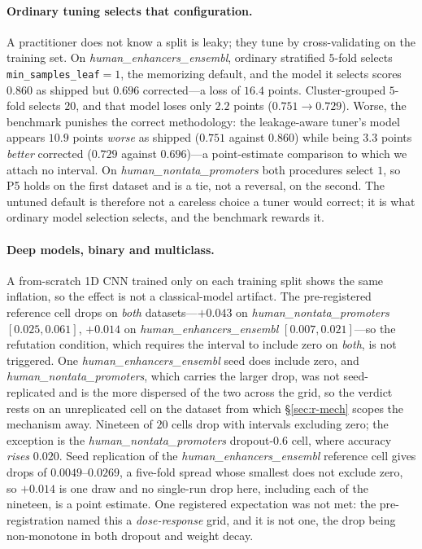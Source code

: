 \documentclass[webpdf,modern,large,namedate]{oup-authoring-template}%
\begin{document}
\paragraph{Ordinary tuning selects that configuration.}\label{sec:r-tuning} A practitioner does not know a split is leaky; they tune by cross-validating on the training set. On \textit{human\_enhancers\_ensembl}, ordinary stratified $5$-fold selects \texttt{min\_samples\_leaf}$=1$, the memorizing default, and the model it selects scores $0.860$ as shipped but $0.696$ corrected---a loss of $16.4$ points. Cluster-grouped $5$-fold selects $20$, and that model loses only $2.2$ points ($0.751\to0.729$). Worse, the benchmark punishes the correct methodology: the leakage-aware tuner's model appears $10.9$ points \emph{worse} as shipped ($0.751$ against $0.860$) while being $3.3$ points \emph{better} corrected ($0.729$ against $0.696$)---a point-estimate comparison to which we attach no interval. On \textit{human\_nontata\_promoters} both procedures select $1$, so P5 holds on the first dataset and is a tie, not a reversal, on the second. The untuned default is therefore not a careless choice a tuner would correct; it is what ordinary model selection selects, and the benchmark rewards it.

\paragraph{Deep models, binary and multiclass.}\label{sec:r-deep} A from-scratch 1D CNN trained only on each training split shows the same inflation, so the effect is not a classical-model artifact. The pre-registered reference cell drops on \emph{both} datasets---$+0.043$ on \textit{human\_nontata\_promoters} $[0.025,0.061]$, $+0.014$ on \textit{human\_enhancers\_ensembl} $[0.007,0.021]$---so the refutation condition, which requires the interval to include zero on \emph{both}, is not triggered. One \textit{human\_enhancers\_ensembl} seed does include zero, and \textit{human\_nontata\_promoters}, which carries the larger drop, was not seed-replicated and is the more dispersed of the two across the grid, so the verdict rests on an unreplicated cell on the dataset from which \S\ref{sec:r-mech} scopes the mechanism away. Nineteen of $20$ cells drop with intervals excluding zero; the exception is the \textit{human\_nontata\_promoters} dropout-$0.6$ cell, where accuracy \emph{rises} $0.020$. Seed replication of the \textit{human\_enhancers\_ensembl} reference cell gives drops of $0.0049$--$0.0269$, a five-fold spread whose smallest does not exclude zero, so $+0.014$ is one draw and no single-run drop here, including each of the nineteen, is a point estimate. One registered expectation was not met: the pre-registration named this a \emph{dose-response} grid, and it is not one, the drop being non-monotone in both dropout and weight decay.
\end{document}
